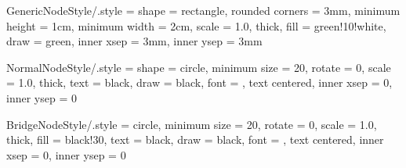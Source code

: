 \tikzset
{
	GenericNodeStyle/.style =
	{
		shape = rectangle,							%
		rounded corners	= 3mm,					%
		minimum height	= 1cm,					%
		minimum width	= 2cm,					%
		scale			= 1.0,					%
		thick,									%
		fill			= green!10!white,				%
		draw			= green,				%
		inner xsep		= 3mm,					%
		inner ysep		= 3mm					%
	}
}




\tikzset
{
	NormalNodeStyle/.style =
	{
		shape = circle,							%
		minimum size	= 20,					%
		rotate			= 0,					%
		scale			= 1.0,					%
		thick,									%
		text			= black,				%
		draw			= black,				%
		font			= \small,				%
		text centered,							%
		inner xsep		= 0,					%
		inner ysep		= 0						%
	}
}



\tikzset
{
	BridgeNodeStyle/.style =
	{
		circle,									%
		minimum size	= 20,					%
		rotate			= 0,					%
		scale			= 1.0,					%
		thick,									%
		fill			= black!30,				%
		text			= black,				%
		draw			= black,				%
		font			= \small,				%
		text centered,							%
		inner xsep		= 0,					%
		inner ysep		= 0						%
	}
}






